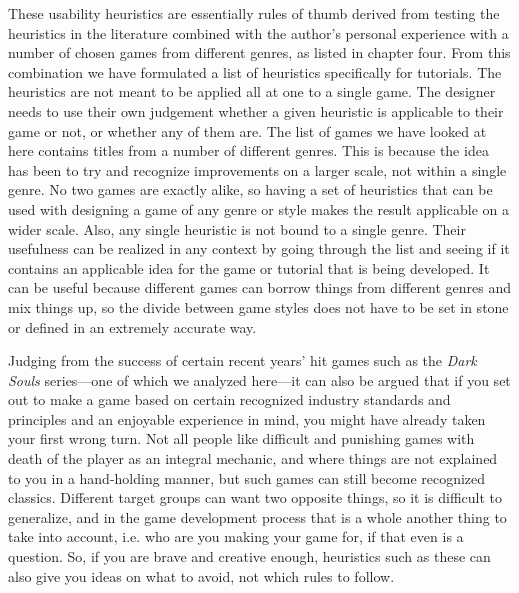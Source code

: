 These usability heuristics are essentially rules of thumb derived from testing the heuristics in the literature combined with the author's personal experience with a number of chosen games from different genres, as listed in chapter four. From this combination we have formulated a list of heuristics specifically for tutorials. The heuristics are not meant to be applied all at one to a single game. The designer needs to use their own judgement whether a given heuristic is applicable to their game or not, or whether any of them are. The list of games we have looked at here contains titles from a number of different genres. This is because the idea has been to try and recognize improvements on a larger scale, not within a single genre. No two games are exactly alike, so having a set of heuristics that can be used with designing a game of any genre or style makes the result applicable on a wider scale. Also, any single heuristic is not bound to a single genre. Their usefulness can be realized in any context by going through the list and seeing if it contains an applicable idea for the game or tutorial that is being developed. It can be useful because different games can borrow things from different genres and mix things up, so the divide between game styles does not have to be set in stone or defined in an extremely accurate way. 

Judging from the success of certain recent years' hit games such as the \textit{Dark Souls} series---one of which we analyzed here---it can also be argued that if you set out to make a game based on certain recognized industry standards and principles and an enjoyable experience in mind, you might have already taken your first wrong turn. Not all people like difficult and punishing games with death of the player as an integral mechanic, and where things are not explained to you in a hand-holding manner, but such games can still become recognized classics. Different target groups can want two opposite things, so it is difficult to generalize, and in the game development process that is a whole another thing to take into account, i.e. who are you making your game for, if that even is a question. So, if you are brave and creative enough, heuristics such as these can also give you ideas on what to avoid, not which rules to follow.

